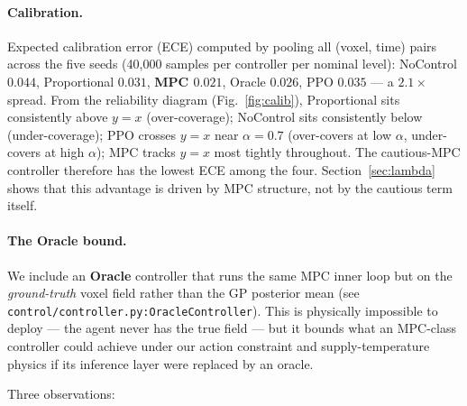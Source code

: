 \documentclass[11pt,letterpaper]{article}
\begin{document}
\paragraph{Calibration.} Expected calibration error (ECE) computed by
pooling all (voxel, time) pairs across the five seeds (40,000 samples
per controller per nominal level):
NoControl $0.044$, Proportional $0.031$, \textbf{MPC $0.021$},
Oracle $0.026$, PPO $0.035$ --- a $2.1\times$ spread. From the reliability diagram (Fig.~\ref{fig:calib}),
Proportional sits consistently above $y = x$ (over-coverage); NoControl
sits consistently below (under-coverage); PPO crosses $y = x$ near
$\alpha = 0.7$ (over-covers at low $\alpha$, under-covers at high
$\alpha$); MPC tracks $y = x$ most tightly throughout. The cautious-MPC
controller therefore has the lowest ECE among the four. Section~\ref{sec:lambda}
shows that this advantage is driven by MPC structure, not by the
cautious term itself.

\paragraph{The Oracle bound.}
\label{sec:results-oracle}
We include an \textbf{Oracle} controller that runs the same MPC inner
loop but on the \emph{ground-truth} voxel field rather than the GP
posterior mean (see \texttt{control/controller.py:OracleController}).
This is physically impossible to deploy --- the agent never has the
true field --- but it bounds what an MPC-class controller could
achieve under our action constraint and supply-temperature physics if
its inference layer were replaced by an oracle.

Three observations:
\end{document}
